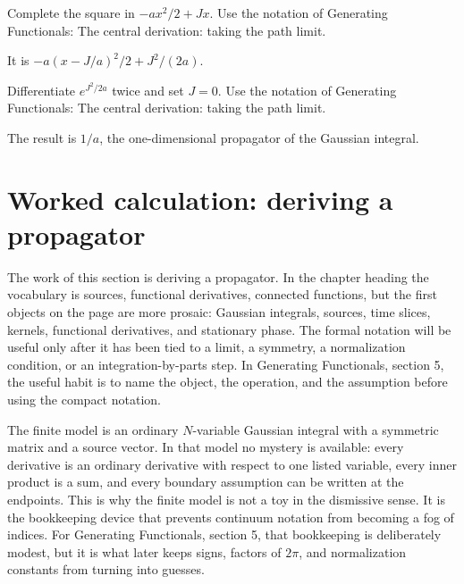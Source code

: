 \begin{exercise}
Complete the square in \(-ax^2/2+Jx\).  Use the notation of Generating Functionals: The central derivation: taking the path limit.
\begin{answer}
It is \(-a(x-J/a)^2/2+J^2/(2a)\).
\end{answer}
\end{exercise}

\begin{exercise}
Differentiate \(e^{J^2/2a}\) twice and set \(J=0\).  Use the notation of Generating Functionals: The central derivation: taking the path limit.
\begin{answer}
The result is \(1/a\), the one-dimensional propagator of the Gaussian integral.
\end{answer}
\end{exercise}



\section{Worked calculation: deriving a propagator}













The work of this section is deriving a propagator.  In the chapter heading the vocabulary is sources, functional derivatives, connected functions, but the first objects on the page are more prosaic: Gaussian integrals, sources, time slices, kernels, functional derivatives, and stationary phase.  The formal notation will be useful only after it has been tied to a limit, a symmetry, a normalization condition, or an integration-by-parts step.  In Generating Functionals, section 5, the useful habit is to name the object, the operation, and the assumption before using the compact notation.

The finite model is an ordinary \(N\)-variable Gaussian integral with a symmetric matrix and a source vector.  In that model no mystery is available: every derivative is an ordinary derivative with respect to one listed variable, every inner product is a sum, and every boundary assumption can be written at the endpoints.  This is why the finite model is not a toy in the dismissive sense.  It is the bookkeeping device that prevents continuum notation from becoming a fog of indices.  For Generating Functionals, section 5, that bookkeeping is deliberately modest, but it is what later keeps signs, factors of \(2\pi\), and normalization constants from turning into guesses.

